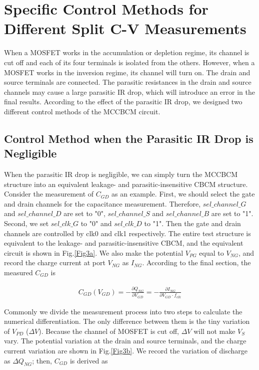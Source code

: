 \documentclass[journal]{IEEEtran}
\begin{document}
\section{Specific Control Methods for Different Split C-V Measurements}

When a MOSFET works in the accumulation or depletion regime, its channel is cut off and each of its four terminals is isolated from the others. However, when a MOSFET works in the inversion regime, its channel will turn on. The drain and source terminals are connected. The parasitic resistances in the drain and source channels may cause a large parasitic IR drop, which will introduce an error in the final results. According to the effect of the parasitic IR drop, we designed two different control methods of the MCCBCM circuit.



\subsection{Control Method when the Parasitic IR Drop is Negligible}

When the parasitic IR drop is negligible, we can simply turn the MCCBCM structure into an equivalent leakage- and parasitic-insensitive CBCM structure. Consider the measurement of $C_{GD}$ as an example. First, we should select the gate and drain channels for the capacitance measurement. Therefore, $sel\_channel\_G$ and $sel\_channel\_D$ are set to "0", $sel\_channel\_S$ and $sel\_channel\_B$ are set to "1". Second, we set $sel\_clk\_G$ to "0" and $sel\_clk\_D$ to "1". Then the gate and drain channels are controlled by clk0 and clk1 respectively. The entire test structure is equivalent to the leakage- and parasitic-insensitive CBCM, and the equivalent circuit is shown in Fig.\ref{Fig3a}. We also make the potential $V_{PG}$ equal to $V_{NG}$, and record the charge current at port $V_{NG}$ as $I_{NG}$. According to the final section, the measured $C_{GD}$ is 

\begin{align}
  C_{GD}(V_{GD})=-\frac{\partial Q_{NG}}{\partial V_{GD}}=-\frac{\partial I_{NG}}{\partial V_{GD}\cdot f_{clk}}
\end{align}

Commonly we divide the measurement process into two steps to calculate the numerical differentiation. The only difference between them is the tiny variation of $V_{PD}$ ($\Delta V$). Because the channel of MOSFET is cut off, $\Delta V$ will not make $V_{S}$ vary. The potential variation at the drain and source terminals, and the charge current variation are shown in Fig.\ref{Fig3b}. We record the variation of discharge as $\Delta Q_{NG}$; then, $C_{GD}$ is derived as 
\end{document}
